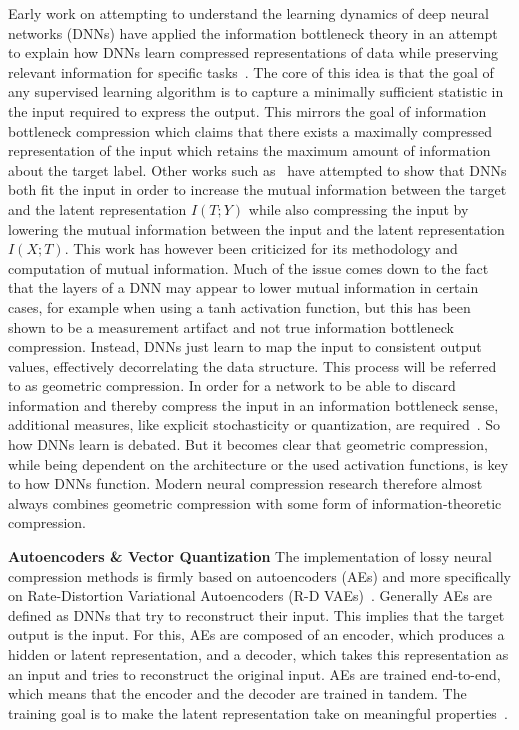 Early work on attempting to understand the learning dynamics of deep neural networks (DNNs) have applied the information bottleneck theory in an attempt to explain how DNNs learn compressed representations of data while preserving relevant information for specific tasks~\cite[pp.~1-5]{Tishby2015}. The core of this idea is that the goal of any supervised learning algorithm is to capture a minimally sufficient statistic in the input required to express the output. This mirrors the goal of information bottleneck compression which claims that there exists a maximally compressed representation of the input which retains the maximum amount of information about the target label. Other works such as~\cite{Shwartz2017} have attempted to show that DNNs both fit the input in order to increase the mutual information between the target and the latent representation $I(T;Y)$ while also compressing the input by lowering the mutual information between the input and the latent representation $I(X;T)$. This work has however been criticized for its methodology and computation of mutual information. Much of the issue comes down to the fact that the layers of a DNN may appear to lower mutual information in certain cases, for example when using a tanh activation function, but this has been shown to be a measurement artifact and not true information bottleneck compression. Instead, DNNs just learn to map the input to consistent output values, effectively decorrelating the data structure. This process will be referred to as geometric compression. In order for a network to be able to discard information and thereby compress the input in an information bottleneck sense, additional measures, like explicit stochasticity or quantization, are required~\cite{Saxe2018, Goldfeld2020}. So how DNNs learn is debated. But it becomes clear that geometric compression, while being dependent on the architecture or the used activation functions, is key to how DNNs function. Modern neural compression research therefore almost always combines geometric compression with some form of information-theoretic compression.

\textbf{Autoencoders \& Vector Quantization} 
The implementation of lossy neural compression methods is firmly based on autoencoders (AEs) and more specifically on Rate-Distortion Variational Autoencoders (R-D VAEs)~\cite[pp.~145--146]{Yang2022}. Generally AEs are defined as DNNs that try to reconstruct their input. This implies that the target output is the input. For this, AEs are composed of an encoder, which produces a hidden or latent representation, and a decoder, which takes this representation as an input and tries to reconstruct the original input. AEs are trained end-to-end, which means that the encoder and the decoder are trained in tandem. The training goal is to make the latent representation take on meaningful properties~\cite{Chen2023}.


